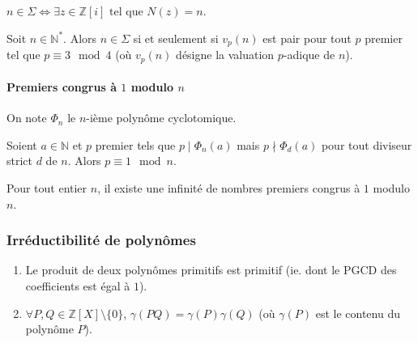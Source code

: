   \begin{remark}
    $n \in \Sigma \iff \exists z \in \mathbb{Z}[i] \text{ tel que } N(z)=n$.
  \end{remark}

  \begin{theorem}
    Soit $n \in \mathbb{N}^*$. Alors $n \in \Sigma$ si et seulement si $v_p(n)$ est pair pour tout $p$ premier tel que $p \equiv 3 \mod 4$ (où $v_p(n)$ désigne la valuation $p$-adique de $n$).
  \end{theorem}

  \paragraph{Premiers congrus à \texorpdfstring{$1$}{1} modulo \texorpdfstring{$n$}{n}}


  \begin{notation}
    On note $\Phi_n$ le $n$-ième polynôme cyclotomique.
  \end{notation}

  \begin{lemma}
    Soient $a \in \mathbb{N}$ et $p$ premier tels que $p \mid \Phi_n(a)$ mais $p \nmid \Phi_d(a)$ pour tout diviseur strict $d$ de $n$. Alors $p \equiv 1 \mod n$.
  \end{lemma}


  \begin{theorem}
    Pour tout entier $n$, il existe une infinité de nombres premiers congrus à $1$ modulo $n$.
  \end{theorem}

  \subsubsection{Irréductibilité de polynômes}


  \begin{lemma}[Gauss]
    \begin{enumerate}[label=(\roman*)]
      \item Le produit de deux polynômes primitifs est primitif (ie. dont le PGCD des coefficients est égal à $1$).
      \item $\forall P, Q \in \mathbb{Z}[X] \setminus \{ 0 \}$, $\gamma(PQ) = \gamma(P) \gamma(Q)$ (où $\gamma(P)$ est le contenu du polynôme $P$).
    \end{enumerate}
  \end{lemma}

